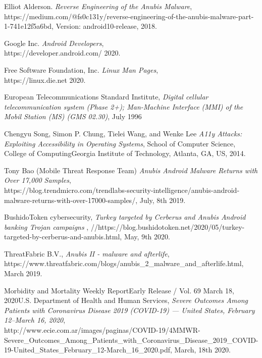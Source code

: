 \documentclass[10pt,titlepage]{article}
\begin{document}
\newpage
\onecolumn
\renewcommand{\refname}{\section{REFERENCES}} 
\begin{thebibliography}{9}

  Elliot Alderson.
  \textit{Reverse Engineering of the Anubis Malware},
  \\https://medium.com/@fs0c131y/reverse-engineering-of-the-anubis-malware-part-1-741e12f5a6bd,
  Version: android10-release,
  2018.
  
  Google Inc.
  \textit{Android Developers},
  \\https://developer.android.com/
  2020.
  
  Free Software Foundation, Inc.
  \textit{Linux Man Pages},
  \\https://linux.die.net
  2020.
  
  European Telecommunications Standard Institute,
  \textit{Digital cellular telecommunication system (Phase 2+); Man-Machine Interface (MMI) of the Mobil Station (MS) (GMS 02.30)},
  July 1996
  
  Chengyu Song, Simon P. Chung, Tielei Wang, and Wenke Lee
  \textit{A11y Attacks: Exploiting Accessibility in Operating Systems},
  School of Computer Science, College of ComputingGeorgia Institute of Technology, Atlanta, GA, US,
  2014.
  
  Tony Bao (Mobile Threat Response Team)
  \textit{Anubis Android Malware Returns with Over 17,000 Samples},
  \\https://blog.trendmicro.com/trendlabs-security-intelligence/anubis-android-malware-returns-with-over-17000-samples/,
  July, 8th 2019.
  
  BushidoToken cybersecurity,
  \textit{Turkey targeted by Cerberus and Anubis Android banking Trojan campaigns },
  //https://blog.bushidotoken.net/2020/05/turkey-targeted-by-cerberus-and-anubis.html,
  May, 9th 2020.

  ThreatFabric B.V.,
  \textit{Anubis II - malware and afterlife},
  \\https://www.threatfabric.com/blogs/anubis\_2\_malware\_and\_afterlife.html,
  March 2019.
  
  Morbidity and Mortality Weekly ReportEarly Release / Vol. 69 March 18, 2020U.S. Department of Health and Human Services,
  \textit{Severe Outcomes Among Patients with Coronavirus Disease 2019 (COVID-19) — United States, February 12–March 16, 2020},
  \\http://www.ecie.com.ar/images/paginas/COVID-19/4MMWR-Severe\_Outcomes\_Among\_Patients\_with\_Coronavirus\_Disease\_2019\_COVID-19-United\_States\_February\_12-March\_16\_2020.pdf,
  March, 18th 2020.
  

\end{thebibliography}
\end{document}
